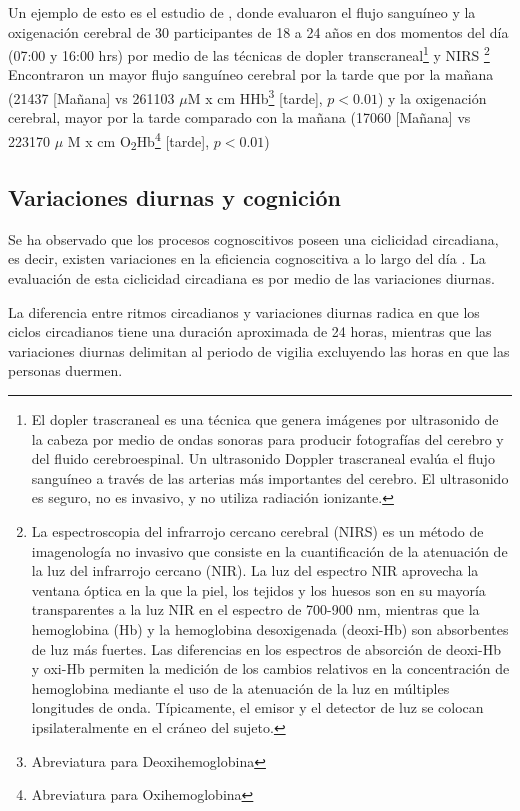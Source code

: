 \documentclass[12pt,letterpaper,final]{article}
\newcommand{\rpm}{\raisebox{.2ex}{$\scriptstyle\pm$}} %
\let\cite\cite %
\begin{document}
Un ejemplo de esto es el estudio de , donde evaluaron el flujo sanguíneo y la oxigenación cerebral de 30 participantes de 18 a 24 años en dos momentos del día (07:00 y 16:00 hrs) por medio de las técnicas de dopler transcraneal\footnote{El dopler trascraneal es una técnica que genera imágenes por ultrasonido de la cabeza por medio de ondas sonoras para producir fotografías del cerebro y del fluido cerebroespinal. Un ultrasonido Doppler trascraneal evalúa el flujo sanguíneo a través de las arterias más importantes del cerebro. El ultrasonido es seguro, no es invasivo, y no utiliza radiación ionizante.} y NIRS \footnote{La  espectroscopia del infrarrojo cercano cerebral (NIRS) es un método de imagenología no invasivo que consiste en la cuantificación de la atenuación de la luz del infrarrojo cercano (NIR). La luz del espectro NIR aprovecha la ventana óptica en la que la piel, los tejidos y los huesos son en su mayoría transparentes a la luz NIR en el espectro de 700-900 nm, mientras que la hemoglobina (Hb) y la hemoglobina desoxigenada (deoxi-Hb) son absorbentes de luz más fuertes. Las diferencias en los espectros de absorción de deoxi-Hb y oxi-Hb permiten la medición de los cambios relativos en la concentración de hemoglobina mediante el uso de la atenuación de la luz en múltiples longitudes de onda. Típicamente, el emisor y el detector de luz se colocan ipsilateralmente en el cráneo del sujeto.} 
Encontraron un mayor flujo sanguíneo cerebral por la tarde que por la mañana (214\rpm 37  [Mañana]  vs 261\rpm 103 $\mu$M x cm HHb\footnote{Abreviatura para Deoxihemoglobina} [tarde],  $ p< 0.01 $) y la oxigenación cerebral, mayor por la tarde comparado con la mañana (170\rpm 60 [Mañana]  vs 223\rpm 170 $\mu$ M x cm O\textsubscript{2}Hb\footnote{Abreviatura para Oxihemoglobina} [tarde], $p < 0.01$)

\subsection{Variaciones diurnas y cognición}
Se ha observado que los procesos cognoscitivos poseen una ciclicidad circadiana, es decir, existen variaciones en la eficiencia cognoscitiva a lo largo del día \cite{Valdez2012}. La evaluación de esta ciclicidad circadiana es por medio de las variaciones diurnas.

La diferencia entre ritmos circadianos y variaciones diurnas radica en que los ciclos circadianos tiene una duración aproximada de 24 horas, mientras que las variaciones diurnas delimitan al periodo de vigilia excluyendo las horas en que las personas duermen.
\end{document}
